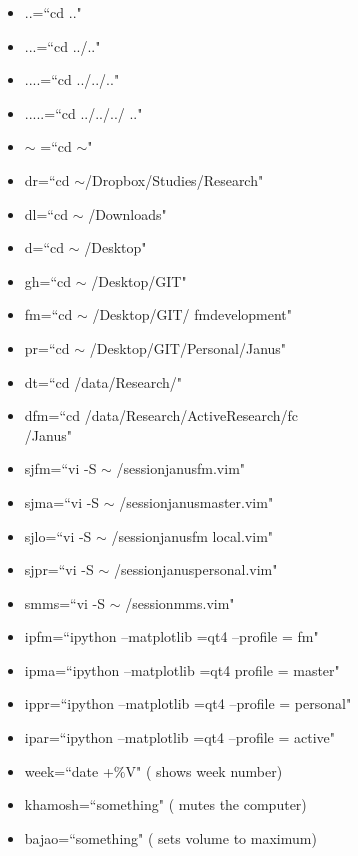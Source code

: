 \documentclass[twoside,a4paper]{article}
\newcommand{\tcb}{\color{blue}}
\newcommand{\tcr}{\color{red}}
\newcommand{\tcg}{\color{gray}}
\newcommand{\tck}{\color{black}}
\begin{document}
\begin{multicols}{2}
	\begin{itemize}
		\item \tcr ..\tck =\tcb ``cd .."
		\item \tcr ...\tck =\tcb ``cd ../.."
		\item \tcr ....\tck =\tcb ``cd ../../.."
		\item \tcr .....\tck =\tcb ``cd ../../../
		.."
		\item \tcr $\sim$ \tck =\tcb ``cd $\sim$"
		\item \tcr dr\tck =\tcb ``cd 
		$\sim$/Dropbox/Studies/Research"
		\item \tcr dl\tck =\tcb ``cd $\sim$
		/Downloads"
		\item \tcr d\tck =\tcb ``cd $\sim$
		/Desktop"
		\item \tcr gh\tck =\tcb ``cd $\sim$
		/Desktop/GIT"
		\item \tcr fm\tck =\tcb ``cd $\sim$
		/Desktop/GIT/
		fm\textunderscore development"
		\item \tcr pr\tck =\tcb ``cd $\sim$
		/Desktop/GIT/Personal/Janus"
		\item \tcr dt\tck =\tcb ``cd 
		/data/Research/"
		\item \tcr dfm\tck =\tcb ``cd 
		/data/Research/Active\textunderscore Research/fc \\
		/Janus"
		\item \tcr sjfm\tck =\tcb ``vi -S $\sim$
		/session\textunderscore janus\textunderscore fm.vim"
		\item \tcr sjma\tck =\tcb ``vi -S $\sim$
		/session\textunderscore janus\textunderscore master.vim"
		\item \tcr sjlo\tck =\tcb ``vi -S $\sim$
		/session\textunderscore janus\textunderscore fm\textunderscore
		local.vim"
		\item \tcr sjpr\tck =\tcb ``vi -S $\sim$
		/session\textunderscore janus\textunderscore personal.vim"
		\item \tcr smms\tck =\tcb ``vi -S $\sim$
		/session\textunderscore mms.vim"
		\item \tcr ipfm\tck =\tcb ``ipython 
		--matplotlib =qt4 --profile = fm"
		\item \tcr ipma\tck =\tcb ``ipython 
		--matplotlib =qt4 profile = master"
		\item \tcr ippr\tck =\tcb ``ipython 
		--matplotlib =qt4 --profile = personal"
		\item \tcr ipar\tck =\tcb ``ipython 
		--matplotlib =qt4 --profile = active"
		\item \tcr week\tck =\tcb ``date +$\%$V" 
		\tcg  ( shows week number)
		\item \tcr khamosh\tck =\tcb ``something" 
		\tcg  ( mutes the computer)
		\item \tcr bajao\tck =\tcb ``something" 
		\tcg  ( sets volume to maximum)
	\end{itemize}
\vfill \eject

\end{multicols}
\end{document}
